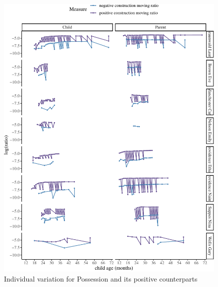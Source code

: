 \documentclass[
  english,
  man,floatsintext]{apa6}
\begin{document}
\begin{figure}[H]

{\centering \includegraphics{neg_construction_article_files/figure-latex/individualpossession-1} 

}

\caption{Individual variation for Possession and its positive counterparts}\label{fig:individualpossession}
\end{figure}
\end{document}
